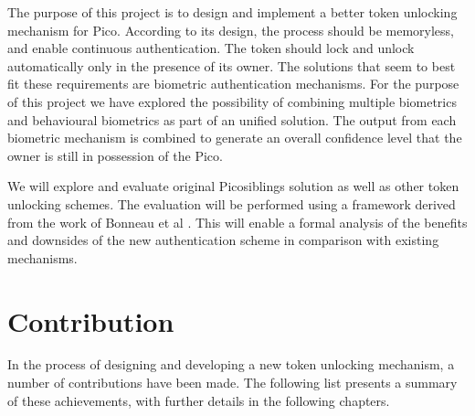 The purpose of this project is to design and implement a better token unlocking mechanism for Pico. According to its design, the process should be memoryless, and enable continuous authentication. The token should lock and unlock automatically only in the presence of its owner. The solutions that seem to best fit these requirements are biometric authentication mechanisms. For the purpose of this project we have explored the possibility of combining multiple biometrics and behavioural biometrics as part of an unified solution. The output from each biometric mechanism is combined to generate an overall confidence level that the owner is still in possession of the Pico.

We will explore and evaluate original Picosiblings solution as well as other token unlocking schemes. The evaluation will be performed using a framework derived from the work of Bonneau et al \cite{bonneau2012quest}. This will enable a formal analysis of the benefits and downsides of the new authentication scheme in comparison with existing mechanisms. 

\section*{Contribution}
In the process of designing and developing a new token unlocking mechanism, a number of contributions have been made. The following list presents a summary of these achievements, with further details in the following chapters.

